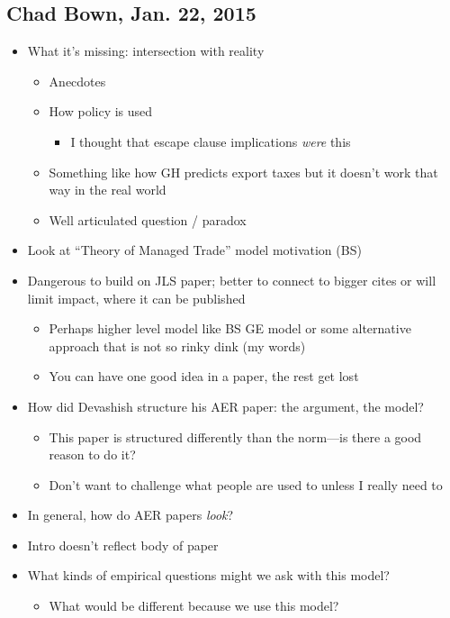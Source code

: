\documentclass[12pt]{article}
\begin{document}
\subsection{Chad Bown, Jan. 22, 2015}
\begin{itemize}
	\item What it's missing: intersection with reality
		\begin{itemize}
			\item Anecdotes
			\item How policy is used
				\begin{itemize}
					\item I thought that escape clause implications \textit{were} this
				\end{itemize}
			\item Something like how GH predicts export taxes but it doesn't work that way in the real world
			\item Well articulated question / paradox
		\end{itemize}
	\item Look at ``Theory of Managed Trade'' model motivation (BS)
	\item Dangerous to build on JLS paper; better to connect to bigger cites or will limit impact, where it can be published
		\begin{itemize}
			\item Perhaps higher level model like BS GE model or some alternative approach that is not so rinky dink (my words)
			\item You can have one good idea in a paper, the rest get lost
		\end{itemize}
	\item How did Devashish structure his AER paper: the argument, the model?
		\begin{itemize}
			\item This paper is structured differently than the norm---is there a good reason to do it?
			\item Don't want to challenge what people are used to unless I really need to
		\end{itemize}
	\item In general, how do AER papers \textit{look}?
	\item Intro doesn't reflect body of paper
	\item What kinds of empirical questions might we ask with this model?
		\begin{itemize}
			\item What would be different because we use this model?
		\end{itemize}
\end{itemize}
\end{document}
